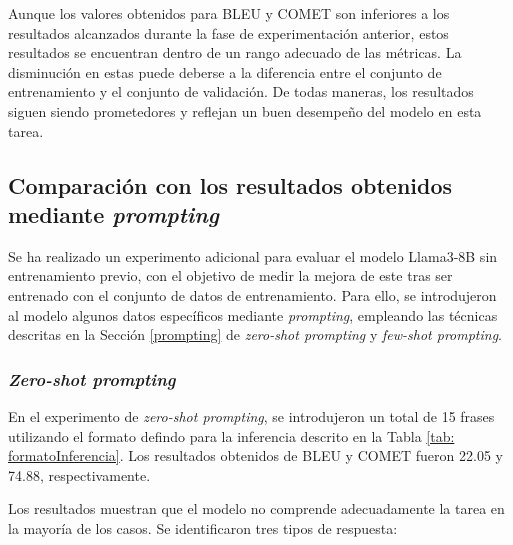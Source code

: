 \documentclass[11pt,spanish,listoffigures,listoftables]{tfgetsinf}
\begin{document}
Aunque los valores obtenidos para BLEU y COMET son inferiores a los resultados alcanzados durante la fase de experimentación anterior, estos resultados se encuentran dentro de un rango adecuado de las métricas. La disminución en estas puede deberse a la diferencia entre el conjunto de entrenamiento y el conjunto de validación. De todas maneras, los resultados siguen siendo prometedores y reflejan un buen desempeño del modelo en esta tarea.

\subsection{Comparación con los resultados obtenidos mediante \textit{prompting}}

Se ha realizado un experimento adicional para evaluar el modelo Llama3-8B sin entrenamiento previo, con el objetivo de medir la mejora de este tras ser entrenado con el conjunto de datos de entrenamiento. Para ello, se introdujeron al modelo algunos datos específicos mediante
 \textit{prompting}, empleando las técnicas descritas en la Sección \ref{prompting} de \textit{zero-shot prompting} y \textit{few-shot prompting}.

\subsubsection{\textit{Zero-shot prompting}}

En el experimento de \textit{zero-shot prompting}, se introdujeron un total de 15 frases utilizando el formato defindo para la inferencia descrito en la Tabla \ref{tab: formatoInferencia}. Los resultados obtenidos de BLEU y COMET fueron 22.05 y 74.88, respectivamente.

Los resultados muestran que el modelo no comprende adecuadamente la tarea en la mayoría de los casos. Se identificaron tres tipos de respuesta:
\end{document}
